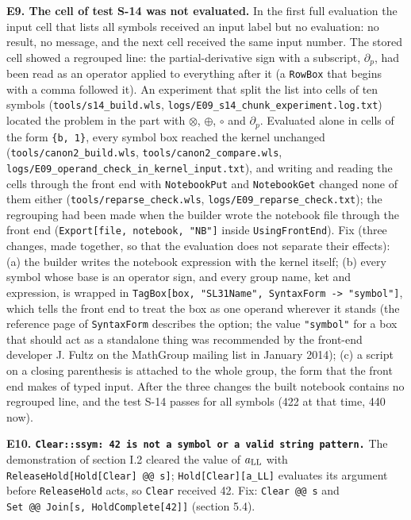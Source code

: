 \documentclass[
  10pt,
]{article}
\begin{document}
\textbf{E9. The cell of test S-14 was not evaluated.} In the first full
evaluation the input cell that lists all symbols received an input label
but no evaluation: no result, no message, and the next cell received the
same input number. The stored cell showed a regrouped line: the
partial-derivative sign with a subscript, \(\partial_p\), had been read
as an operator applied to everything after it (a \texttt{RowBox} that
begins with a comma followed it). An experiment that split the list into
cells of ten symbols (\texttt{tools/s14\_build.wls},
\texttt{logs/E09\_s14\_chunk\_experiment.log.txt}) located the problem
in the part with \(\otimes\), \(\oplus\), \(\circ\) and \(\partial_p\).
Evaluated alone in cells of the form \texttt{\{b,\ 1\}}, every symbol
box reached the kernel unchanged (\texttt{tools/canon2\_build.wls},
\texttt{tools/canon2\_compare.wls},
\texttt{logs/E09\_operand\_check\_in\_kernel\_input.txt}), and writing
and reading the cells through the front end with \texttt{NotebookPut}
and \texttt{NotebookGet} changed none of them either
(\texttt{tools/reparse\_check.wls},
\texttt{logs/E09\_reparse\_check.txt}); the regrouping had been made
when the builder wrote the notebook file through the front end
(\texttt{Export{[}file,\ notebook,\ "NB"{]}} inside
\texttt{UsingFrontEnd}). Fix (three changes, made together, so that the
evaluation does not separate their effects): (a) the builder writes the
notebook expression with the kernel itself; (b) every symbol whose base
is an operator sign, and every group name, ket and expression, is
wrapped in
\texttt{TagBox{[}box,\ "SL31Name",\ SyntaxForm\ -\textgreater{}\ "symbol"{]}},
which tells the front end to treat the box as one operand wherever it
stands (the reference page of \texttt{SyntaxForm} describes the option;
the value \texttt{"symbol"} for a box that should act as a standalone
thing was recommended by the front-end developer J. Fultz on the
MathGroup mailing list in January 2014); (c) a script on a closing
parenthesis is attached to the whole group, the form that the front end
makes of typed input. After the three changes the built notebook
contains no regrouped line, and the test S-14 passes for all symbols
(422 at that time, 440 now).

\textbf{E10.
\texttt{Clear::ssym:\ 42\ is\ not\ a\ symbol\ or\ a\ valid\ string\ pattern.}}
The demonstration of section I.2 cleared the value of \(a_{\rm LL}\)
with \texttt{ReleaseHold{[}Hold{[}Clear{]}\ @@\ s{]}};
\texttt{Hold{[}Clear{]}{[}a\_LL{]}} evaluates its argument before
\texttt{ReleaseHold} acts, so \texttt{Clear} received 42. Fix:
\texttt{Clear\ @@\ s} and
\texttt{Set\ @@\ Join{[}s,\ HoldComplete{[}42{]}{]}} (section 5.4).
\end{document}
